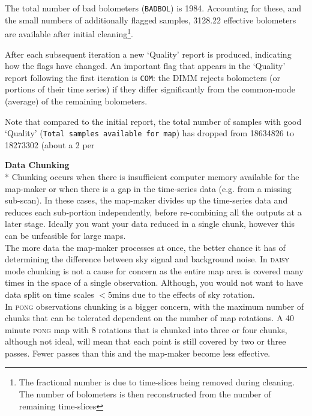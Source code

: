 \documentclass[twoside,11pt]{article}
\newenvironment{fmpage}[1]
{\begin{lrbox}{\fmbox}\begin{minipage}{#1}}
{\end{minipage}\end{lrbox}\fbox{\usebox{\fmbox}}}
\newcounter{box}
\renewcommand{\_}{\texttt{\symbol{95}}}
\begin{document}
The total number of bad bolometers (\texttt{BADBOL}) is 1984. Accounting for these, and the small numbers of additionally flagged samples, 3128.22 effective bolometers are available after initial cleaning\footnote{The fractional number is due to time-slices being removed during cleaning. The number of bolometers is then reconstructed from the number of remaining time-slices}.

After each subsequent iteration a new `Quality' report is produced, indicating how the flags have changed. An important flag that appears in the `Quality' report following the first iteration is \texttt{COM}: the DIMM rejects bolometers (or portions of their time series) if they differ significantly from the common-mode (average) of the remaining bolometers. 

Note that compared to the initial report, the total number of samples with good `Quality' (\texttt{Total samples available for map}) has dropped from 18634826 to 18273302 (about a 2 per 
\begin{center}
\begin{fmpage}{0.92\linewidth}
\label{page:text}
\begin{minipage}[t]{0.025\linewidth}
\hspace{0.1cm}
\end{minipage}
\begin{minipage}[t]{0.93\linewidth}
\vspace{0.2cm}
\textbf{Data Chunking}\\*
Chunking occurs when there is insufficient computer memory available for the map-maker or when there is a gap in the time-series data (e.g. from a missing sub-scan). In these cases, the map-maker divides up the time-series data and reduces each sub-portion independently, before re-combining all the outputs at a later stage. Ideally you want your data reduced in a single chunk, however this can be unfeasible for large maps.
\vspace{0.2cm}\\
The more data the map-maker processes at once, the better chance it has of determining the difference between sky signal and background noise. In \textsc{daisy} mode chunking is not a cause for concern as the entire map area is covered many times in the space of a single observation. Although, you would not want to have data split on time scales $<$5mins due to the effects of sky rotation.
\vspace{0.2cm}\\
In \textsc{pong} observations chunking is a bigger concern, with the maximum number of chunks that can be tolerated dependent on the number of map rotations. A 40 minute \textsc{pong} map with 8 rotations that is chunked into three or four chunks, although not ideal, will mean that each point is still covered by two or three passes. Fewer passes than this and the map-maker become less effective.
 \vspace{0.2cm}
\end{minipage}
\begin{minipage}[t]{0.025\linewidth}
\hspace{0.1cm}
\end{minipage}
\end{fmpage}
\end{center}
\end{document}

